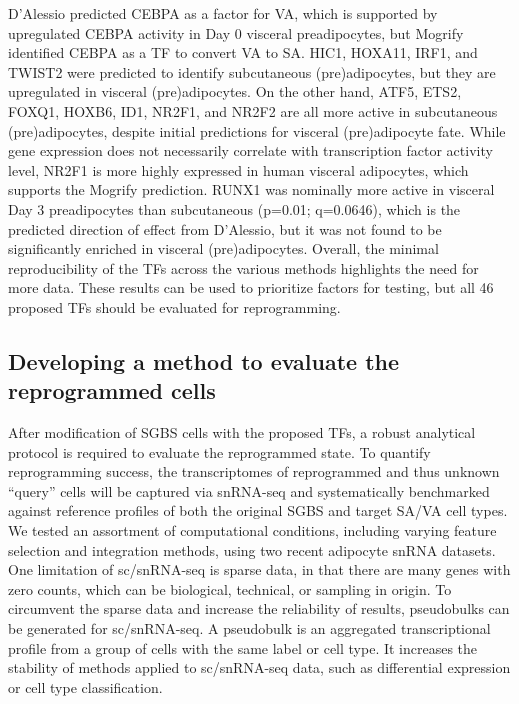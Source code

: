 D'Alessio predicted CEBPA as a factor for VA, which is supported by upregulated CEBPA activity in Day 0 visceral preadipocytes, but Mogrify identified CEBPA as a TF to convert VA to SA. HIC1, HOXA11, IRF1, and TWIST2 were predicted to identify subcutaneous (pre)adipocytes, but they are upregulated in visceral (pre)adipocytes. On the other hand, ATF5, ETS2, FOXQ1, HOXB6, ID1, NR2F1, and NR2F2 are all more active in subcutaneous (pre)adipocytes, despite initial predictions for visceral (pre)adipocyte fate. While gene expression does not necessarily correlate with transcription factor activity level\cite{Cheng2007-mc}, NR2F1 is more highly expressed in human visceral adipocytes\cite{Gesta2006-so}, which supports the Mogrify prediction. RUNX1 was nominally more active in visceral Day 3 preadipocytes than subcutaneous (p=0.01; q=0.0646), which is the predicted direction of effect from D'Alessio, but it was not found to be significantly enriched in visceral (pre)adipocytes. Overall, the minimal reproducibility of the TFs across the various methods highlights the need for more data. These results can be used to prioritize factors for testing, but all 46 proposed TFs should be evaluated for reprogramming.

\subsection{Developing a method to evaluate the reprogrammed cells}

After modification of SGBS cells with the proposed TFs, a robust analytical protocol is required to evaluate the reprogrammed state. To quantify reprogramming success, the transcriptomes of reprogrammed and thus unknown “query” cells will be captured via snRNA-seq and systematically benchmarked against reference profiles of both the original SGBS and target SA/VA cell types. We tested an assortment of computational conditions, including varying feature selection and integration methods, using two recent adipocyte snRNA datasets\cite{Emont2022-pb,Lazarescu2025-ru}. One limitation of sc/snRNA-seq is sparse data, in that there are many genes with zero counts, which can be biological, technical, or sampling in origin\cite{Jiang2022-yf}. To circumvent the sparse data and increase the reliability of results, pseudobulks can be generated for sc/snRNA-seq\cite{Squair2021-wz}. A pseudobulk is an aggregated transcriptional profile from a group of cells with the same label or cell type. It increases the stability of methods applied to sc/snRNA-seq data, such as differential expression or cell type classification\cite{Squair2021-wz,Adamson2016-gi}.   

